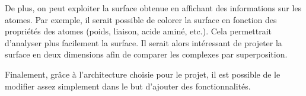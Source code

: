 De plus, on peut exploiter la surface obtenue en affichant des informations sur
les atomes. Par exemple, il serait possible de colorer la surface en fonction des propriétés
des atomes (poids, liaison, acide aminé, etc.). Cela permettrait d'analyser plus facilement
la surface. Il serait alors intéressant de projeter la surface en deux dimensions afin
de comparer les complexes par superposition.

Finalement, grâce à l'architecture choisie pour le projet, il est possible de le
modifier assez simplement dans le but d'ajouter des fonctionnalités.
